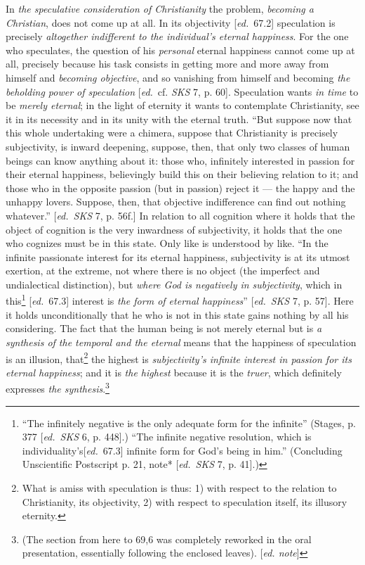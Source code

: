 \documentclass[12pt,a4paper,openany]{book}
\newcommand{\kpage}[1]{\marginnote{\footnotesize\textit{[#1]}}}
\newcommand{\ed}[1]{{\small[\textit{ed.}\ #1]}}
\newcommand{\ednote}[1]{{\small[\textit{ed. note}]}}
\begin{document}
In \emph{the speculative consideration of Christianity} the problem,
\emph{becoming a Christian}, does not come up at all. In its objectivity
\ed{67.2} speculation is precisely \emph{altogether indifferent to the
individual's eternal happiness}. For the one who speculates, the question of his
\emph{personal} eternal happiness cannot come up at all, precisely because his
task consists in getting more and \kpage{110}more away from himself and
\emph{becoming objective}, and so vanishing from himself and becoming \emph{the
beholding power of speculation} \ed{cf. \emph{SKS} 7, p. 60}. Speculation wants
\emph{in time} to be \emph{merely eternal}; in the light of eternity it wants to
contemplate Christianity, see it in its necessity and in its unity with the
eternal truth. ``But suppose now that this whole undertaking were a chimera,
suppose that Christianity is precisely subjectivity, is inward deepening,
suppose, then, that only two classes of human beings can know anything about
it: those who, infinitely interested in passion for their eternal happiness,
believingly build this on their believing relation to it; and those who in the
opposite passion (but in passion) reject it --- the happy and the unhappy
lovers. Suppose, then, that objective indifference can find out nothing
whatever.'' \ed{\emph{SKS} 7, p. 56f.} In relation to all cognition where it
holds that the object of cognition is the very inwardness of subjectivity, it
holds that the one who cognizes must be in this state. Only like is understood
by like. ``In the infinite passionate interest for its eternal happiness,
subjectivity is at its utmost exertion, at the extreme, not where there is no
object (the imperfect and undialectical distinction), but \emph{where God is
negatively in subjectivity}, which in this\footnote[38]{``The infinitely
negative is the only adequate form for the infinite'' (Stages, p. 377
\ed{\emph{SKS} 6, p. 448}.) ``The infinite negative resolution, which is
individuality's\ed{67.3} infinite form for God's being in him.'' (Concluding
Unscientific Postscript p. 21, note* \ed{\emph{SKS} 7, p. 41}.)} \ed{67.3}
interest is \emph{the form of eternal happiness}'' \ed{\emph{SKS} 7, p. 57}.
Here it holds unconditionally that he who is not in this state gains nothing by
all his considering. The fact that the human being is not merely eternal but is
\emph{a synthesis of the temporal and the eternal} means that the happiness of
speculation is an illusion, that\footnote[39]{What is amiss with speculation is
thus: 1) with respect to the relation to Christianity, its objectivity, 2) with
respect to speculation itself, its illusory eternity.} the highest is
\emph{subjectivity's infinite interest in passion for its eternal happiness};
and it is \emph{the highest} because it is the \emph{truer}, which definitely
expresses \emph{the synthesis}.\footnote[40]{(The section from here to 69,6 was
completely reworked in the oral presentation, essentially following the
enclosed leaves).
\ednote{}}
\end{document}
